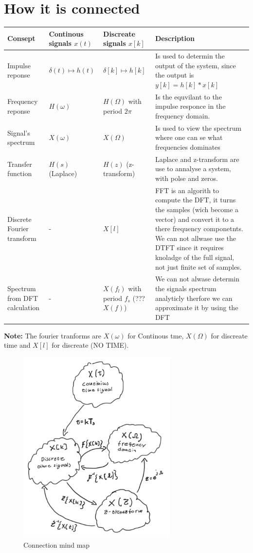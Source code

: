 

\newpage
\section{How it is connected}
\begin{tabular}{|m{2cm}|m{3cm}|m{4cm}|m{6cm}|}
    \hline
    Consept & Continous signals $x(t)$ & Discreate signals $x[k]$ & Description \\
    \hline
    \hline
    Impulse reponse & $\delta(t) \mapsto h(t)$ & $\delta[k] \mapsto h[k]$ & Is used to determin the output of the system, since the output is $y[k]=h[k]*x[k]$ \\
    \hline
    Frequency reponse & $H(\omega)$ & $H(\Omega)$ with period $2\pi$ & Is the equvilant to the impulse responce in the frequency domain. \\
    \hline
    Signal's spectrum & $X(\omega)$ & $X(\Omega)$ & Is used to view the spectrum where one can se what frequencies dominates \\
    \hline
    Transfer function & $H(s)$ (Laplace) & $H(z)$ (z-transform) & Laplace and z-transform are use to annalyse a system, with polse and zeros. \\
    \hline
    Discrete Fourier transform & - & $X[l]$ & FFT is an algorith to compute the DFT, it turns the samples (wich become a vector) and convert it to a there frequency componetnts. We can not allwase use the DTFT since it requires knoladge of the full signal, not just finite set of samples. \\
    \hline
    Spectrum from DFT calculation & - & $X(f_l)$ with period $f_s$ (???$X(f)$) & We can not alwase determin the signals spectrum analyticly therfore we can approximate it by using the DFT \\
    \hline
\end{tabular}
\textbf{Note:} The fourier tranforms are $X(\omega)$ for Continous tme, $X(\Omega)$ for discreate time and 
$X[l]$ for discreate (NO TIME).  

\begin{figure}[!h]
   \centering
   \includegraphics[width=8cm]{image/connection_mind-map.pdf} 
   \caption{Connection mind map}
   \label{fig:connection_mind-map}
\end{figure}



